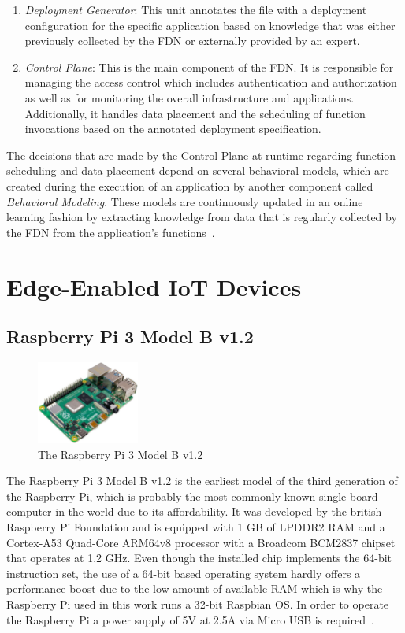\begin{enumerate}
    \item \textit{Deployment Generator}: This unit annotates the file with a deployment configuration for the specific application based on knowledge that was either previously collected by the FDN or externally provided by an expert.
    \item \textit{Control Plane}: This is the main component of the FDN. It is responsible for managing the access control which includes authentication and authorization as well as for monitoring the overall infrastructure and applications. Additionally, it handles data placement and the scheduling of function invocations based on the annotated deployment specification.
\end{enumerate}

The decisions that are made by the Control Plane at runtime regarding function scheduling and data placement depend on several behavioral models, which are created during the execution of an application by another component called \textit{Behavioral Modeling}. These models are continuously updated in an online learning fashion by extracting knowledge from data that is regularly collected by the FDN from the application's functions~\parencite{fdn}.

\section{Edge-Enabled IoT Devices}

\subsection{Raspberry Pi 3 Model B v1.2}

\begin{figure}[h]
    \centering
    \includegraphics[width=0.30\textwidth]{./figures/mesh}
    \caption{The Raspberry Pi 3 Model B v1.2}
    \label{fig:raspberry-pi}
\end{figure}


The Raspberry Pi 3 Model B v1.2 is the earliest model of the third generation of the Raspberry Pi, which is probably the most commonly known single-board computer in the world due to its affordability. It was developed by the british Raspberry Pi Foundation and is equipped with 1 GB of LPDDR2 RAM and a Cortex-A53 Quad-Core ARM64v8 processor with a Broadcom BCM2837 chipset that operates at 1.2 GHz. Even though the installed chip implements the 64-bit instruction set, the use of a 64-bit based operating system hardly offers a performance boost due to the low amount of available RAM which is why the Raspberry Pi used in this work runs a 32-bit Raspbian OS. In order to operate the Raspberry Pi a power supply of 5V at 2.5A via Micro USB is required~\parencite{raspberry-pi-intro}.

